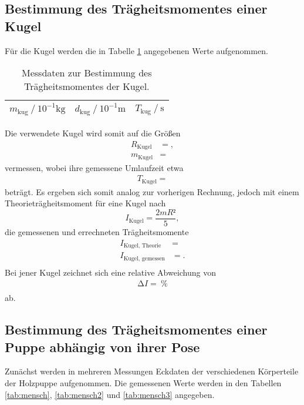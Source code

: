 \subsection{Bestimmung des Trägheitsmomentes einer Kugel}
Für die Kugel werden die in Tabelle \ref{tab:kug} angegebenen Werte aufgenommen.

\begin{table}[H]
  \centering
  \caption{Messdaten zur Bestimmung des Trägheitsmomentes der Kugel.}
  \label{tab:kug}
  \begin{tabular}{c c c}
    \toprule
    {$m_\text{kug} \ /\ 10^{-1} \si{\kilo\gram}$} & {$d_\text{kug} \ /\ 10^{-1} \si{\metre}$} & {$T_\text{kug} \ /\ \si{\second}$}\\
    \midrule
    
    \bottomrule
  \end{tabular}
\end{table}

Die verwendete Kugel wird somit auf die Größen
\begin{align*}
  R_{\text{Kugel}} &= , \\
  m_{\text{Kugel}} &= 
\end{align*}
vermessen, wobei ihre gemessene Umlaufzeit etwa
\begin{align*}
  T_{\text{Kugel}} = 
\end{align*}
beträgt.
Es ergeben sich somit analog zur vorherigen Rechnung, jedoch mit einem Theorieträgheitsmoment für eine Kugel nach
\begin{equation}
  I_{\text{Kugel}} = \frac{2mR²}{5},
\end{equation}
die gemessenen und errechneten Trägheitsmomente
\begin{align*}
  I_{\text{Kugel, Theorie}}  &=  \\
  I_{\text{Kugel, gemessen}} &= . \\
\end{align*}
Bei jener Kugel zeichnet sich eine relative Abweichung von
\begin{align*}
  \increment I =  \:\si{\percent}\\
\end{align*}
ab.


\subsection{Bestimmung des Trägheitsmomentes einer Puppe abhängig von ihrer Pose}
Zunächst werden in mehreren Messungen Eckdaten der verschiedenen Körperteile der Holzpuppe aufgenommen.
Die gemessenen Werte werden in den Tabellen \ref{tab:mensch}, \ref{tab:mensch2} und \ref{tab:mensch3} angegeben.

